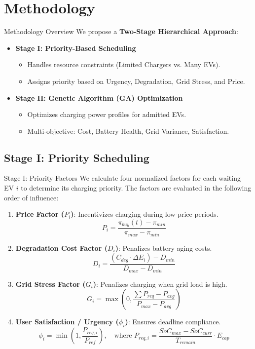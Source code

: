 \documentclass{beamer}
\begin{document}
\section{Methodology}
\begin{frame}{Methodology Overview}
  We propose a \textbf{Two-Stage Hierarchical Approach}:
  \vspace{0.5cm}
  \begin{itemize}
      \item \textbf{Stage I: Priority-Based Scheduling}
      \begin{itemize}
          \item Handles resource constraints (Limited Chargers vs. Many EVs).
          \item Assigns priority based on Urgency, Degradation, Grid Stress, and Price.
      \end{itemize}
      \item \textbf{Stage II: Genetic Algorithm (GA) Optimization}
      \begin{itemize}
          \item Optimizes charging power profiles for admitted EVs.
          \item Multi-objective: Cost, Battery Health, Grid Variance, Satisfaction.
      \end{itemize}
  \end{itemize}
\end{frame}

\subsection{Stage I: Priority Scheduling}
\begin{frame}{Stage I: Priority Factors}
  We calculate four normalized factors for each waiting EV $i$ to determine its charging priority. The factors are evaluated in the following order of influence:

  \begin{enumerate}
      \item \textbf{Price Factor ($P_i$)}: Incentivizes charging during low-price periods.
      $$ P_i = \frac{\pi_{buy}(t) - \pi_{min}}{\pi_{max} - \pi_{min}} $$
      \item \textbf{Degradation Cost Factor ($D_i$)}: Penalizes battery aging costs.
      $$ D_i = \frac{(C_{deg} \cdot \Delta E_i) - D_{min}}{D_{max} - D_{min}} $$
      \item \textbf{Grid Stress Factor ($G_i$)}: Penalizes charging when grid load is high.
      $$ G_i = \max\left(0, \frac{\sum P_{req} - P_{avg}}{P_{max} - P_{avg}}\right) $$
      \item \textbf{User Satisfaction / Urgency ($\phi_i$)}: Ensures deadline compliance.
      $$ \phi_i = \min\left(1, \frac{P_{req,i}}{P_{ref}}\right), \quad \text{where } P_{req,i} = \frac{SoC_{max} - SoC_{curr}}{T_{remain}} \cdot E_{cap} $$
  \end{enumerate}
\end{frame}
\end{document}
